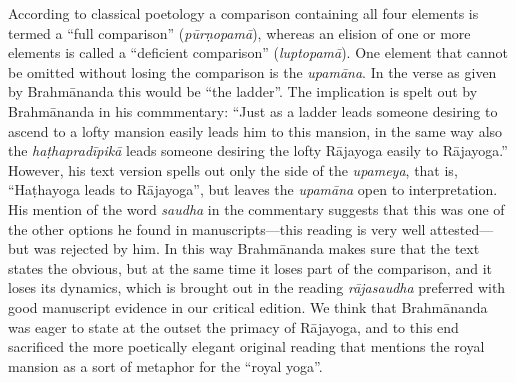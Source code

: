 \begin{ekdosis}
\begin{philcomm}[hp01_001]
According to classical poetology a comparison containing all four elements is termed a ``full
comparison'' (\emph{pūrṇopamā}), whereas an elision of one or more elements is called a ``deficient
comparison'' (\emph{luptopamā}). One element that cannot be omitted without losing the comparison
is the \emph{upamāna}. In the verse as given by Brahmānanda this would be ``the ladder''. The
implication is spelt out by Brahmānanda in his commmentary: ``Just as a ladder leads someone
desiring to ascend to a lofty mansion easily leads him to this mansion, in the same way also the
\emph{haṭhapradīpikā} leads someone desiring the lofty Rājayoga easily to Rājayoga.'' However, his
text version spells out only the side of the \emph{upameya}, that is, ``Haṭhayoga leads to
Rājayoga'', but leaves the \emph{upamāna} open to interpretation. His mention of the word
\emph{saudha} in the commentary suggests that this was one of the other options he found in
manuscripts—this reading is very well attested—but was rejected by him. In this way Brahmānanda
makes sure that the text states the obvious, but at the same time it loses part of the comparison,
and it loses its dynamics, which is brought out in the reading \emph{rājasaudha} preferred with
good manuscript evidence in our critical edition. We think that Brahmānanda was eager to state at
the outset the primacy of Rājayoga, and to this end sacrificed the more poetically elegant original
reading that mentions the royal mansion as a sort of metaphor for the ``royal yoga''.





\end{philcomm}
\end{ekdosis}
